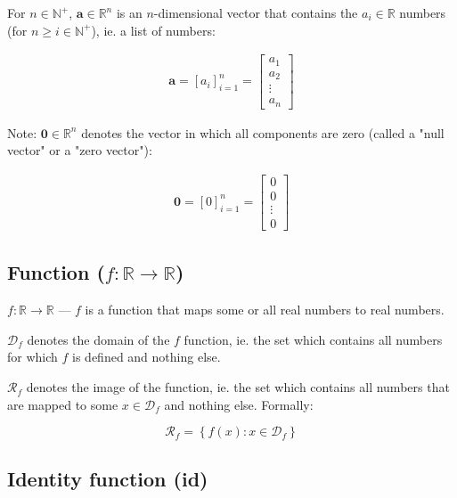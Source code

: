 \documentclass[titlepage]{article}
\begin{document}
        For $n \in \mathbb{N}^+$, $\mathbf{a} \in \mathbb{R}^n$ is an
        $n$-dimensional vector that contains the $a_i \in \mathbb{R}$ numbers
        (for $n \geq i \in \mathbb{N}^+$), ie. a list of numbers:

        \begin{align*}
          \mathbf{a} = \left[ a_i \right]_{i=1}^n
            = \begin{bmatrix}
                a_1 \\
                a_2 \\
                \vdots \\
                a_n
              \end{bmatrix}
        \end{align*}

        Note: $\mathbf{0} \in \mathbb{R}^n$ denotes the vector in which all
        components are zero (called a "null vector" or a "zero vector"):

        \begin{align*}
          \mathbf{0} = \left[ 0 \right]_{i=1}^n
            = \begin{bmatrix}
                0 \\
                0 \\
                \vdots \\
                0
              \end{bmatrix}
        \end{align*}

      \subsection{Function ($f : \mathbb{R} \rightarrow \mathbb{R}$)}

        $f : \mathbb{R} \rightarrow \mathbb{R}$ --- $f$ is a function that
        maps some or all real numbers to real numbers.

        $\mathcal{D}_f$ denotes the domain of the $f$ function, ie. the set
        which contains all numbers for which $f$ is defined and nothing else.

        $\mathcal{R}_f$ denotes the image of the function, ie. the set which
        contains all numbers that are mapped to some $x \in \mathcal{D}_f$ and
        nothing else. Formally:

        $$\mathcal{R}_f = \left\{ f(x) : x \in \mathcal{D}_f\right\}$$

      \subsection{Identity function (id)}
\end{document}
